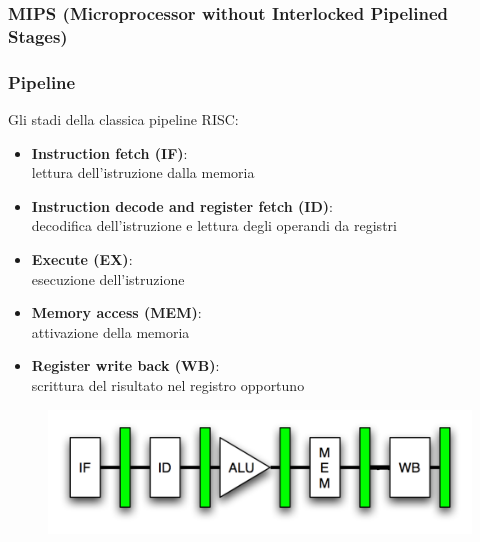 \subsubsection[MIPS (Microprocessor without Interlocked Pipelined Stages)]{MIPS (Microprocessor without Interlocked Pipelined Stages)}
\begin{frame}
	\frametitle{ Pipeline}

		Gli stadi della classica pipeline RISC:
		\begin{itemize}
			\item \textbf{Instruction fetch (IF)}:\\ lettura dell'istruzione dalla memoria
			\item \textbf{Instruction decode and register fetch (ID)}:\\ decodifica dell'istruzione e lettura degli operandi da registri
			\item \textbf{Execute (EX)}:\\ esecuzione dell’istruzione
			\item \textbf{Memory access (MEM)}:\\ attivazione della memoria
			\item \textbf{Register write back (WB)}:\\ scrittura del risultato nel registro opportuno
		\end{itemize}
		
		\begin{figure}[!htbp]
			\centering 
			\includegraphics[width=0.63\linewidth]{images/7_pipeline/pipeline_base.png}
			\label{fig:pipeline_pipeline_base}
		\end{figure}
		

\end{frame}


